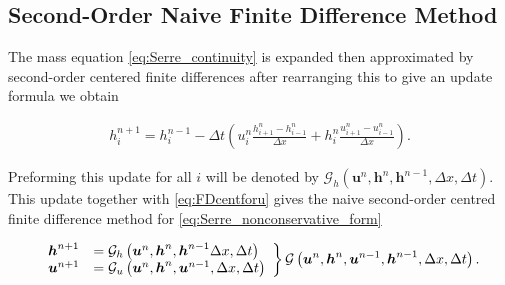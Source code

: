 \documentclass[SingleSpace,12pt,Journal]{Serre_ASCE}
\begin{document}
\subsection{Second-Order Naive Finite Difference Method}
The mass equation \eqref{eq:Serre_continuity} is expanded then approximated by second-order centered finite differences after rearranging this to give an update formula we obtain
\begin{linenomath*}
\begin{gather*}
h^{n+1}_i = h^{n-1}_i - \Delta t \left(u^{n}_{i}\frac{h^{n}_{i+1} - h^{n}_{i-1}}{\Delta x} + h^{n}_{i}\frac{u^{n}_{i+1} - u^{n}_{i-1}}{\Delta x}\right).
\end{gather*}
\end{linenomath*}
Preforming this update for all $i$ will be denoted by $\mathcal{G}_h\left(\boldsymbol{u}^n,\boldsymbol{h}^n,\boldsymbol{h}^{n-1} ,\Delta x, \Delta t \right)$.
This update together with \eqref{eq:FDcentforu} gives the naive second-order centred finite difference method for \eqref{eq:Serre_nonconservative_form}
\begin{linenomath*}
\begin{gather}
\left.
\begin{array}{l l}
\boldsymbol{h}^{n+1}&=\mathcal{G}_h\left(\boldsymbol{u}^n,\boldsymbol{h}^n,\boldsymbol{h}^{n-1} \Delta x, \Delta t \right) \\
\boldsymbol{u}^{n+1}&=\mathcal{G}_u\left(\boldsymbol{u}^n,\boldsymbol{h}^n, \boldsymbol{u}^{n-1}, \Delta x, \Delta t \right)
\end{array} \right\rbrace \mathcal{G}\left(\boldsymbol{u}^n,\boldsymbol{h}^n, \boldsymbol{u}^{n-1},\boldsymbol{h}^{n-1}, \Delta x, \Delta t \right).
\label{eq:Gnumdef}
\end{gather}
\end{linenomath*}
\end{document}
